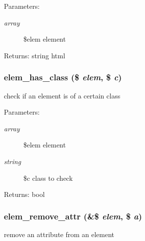 \begin{Desc}
\item[Parameters:]
\begin{description}
\item[{\em array}]\$elem element \end{description}
\end{Desc}
\begin{Desc}
\item[Returns:]string html \end{Desc}
\hypertarget{html_8inc_8php_b1019c4b75181c1c1af10e1c1e5e197d}{
\subsubsection[{elem\_\-has\_\-class}]{\setlength{\rightskip}{0pt plus 5cm}elem\_\-has\_\-class (\$ {\em elem}, \/  \$ {\em c})}}
\label{html_8inc_8php_b1019c4b75181c1c1af10e1c1e5e197d}


check if an element is of a certain class

\begin{Desc}
\item[Parameters:]
\begin{description}
\item[{\em array}]\$elem element \item[{\em string}]\$c class to check \end{description}
\end{Desc}
\begin{Desc}
\item[Returns:]bool \end{Desc}
\hypertarget{html_8inc_8php_eb7074172d9164f69e64967b6bcdc643}{
\subsubsection[{elem\_\-remove\_\-attr}]{\setlength{\rightskip}{0pt plus 5cm}elem\_\-remove\_\-attr (\&\$ {\em elem}, \/  \$ {\em a})}}
\label{html_8inc_8php_eb7074172d9164f69e64967b6bcdc643}


remove an attribute from an element

